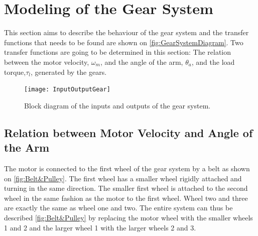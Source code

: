 \graphicspath{{figures/modeling/gearTrain/}}
\section{Modeling of the Gear System}\label{sec:ModGearSys}
This section aims to describe the behaviour of the gear system and the transfer functions that needs to be found are shown on 
\autoref{fig:GearSystemDiagram}.
Two transfer functions are going to be determined in this section: The relation between the motor velocity, $\omega_m$, and the angle of the arm, $\theta_a$, and the load torque,$\tau_l$, generated by the gears.
\begin{figure}[htbp]
	\centering
	\texttt{[image: InputOutputGear]}
	\caption{Block diagram of the inputs and outputs of the gear system.}
	\label{fig:GearSystemDiagram}
\end{figure}
\startexplain
{}
\stopexplain


\subsection{Relation between Motor Velocity and Angle of the Arm}
The motor is connected to the first wheel of the gear system by a belt as shown on \autoref{fig:Belt&Pulley}. The first wheel has a smaller wheel rigidly attached and turning in the same direction. The smaller first wheel is attached to the second wheel in the same fashion as the motor to the first wheel. Wheel two and three are exactly the same as wheel one and two. The entire system can thus be described \autoref{fig:Belt&Pulley} by replacing the motor wheel with the smaller wheels 1 and 2 and the larger wheel 1 with the larger wheels 2 and 3.

